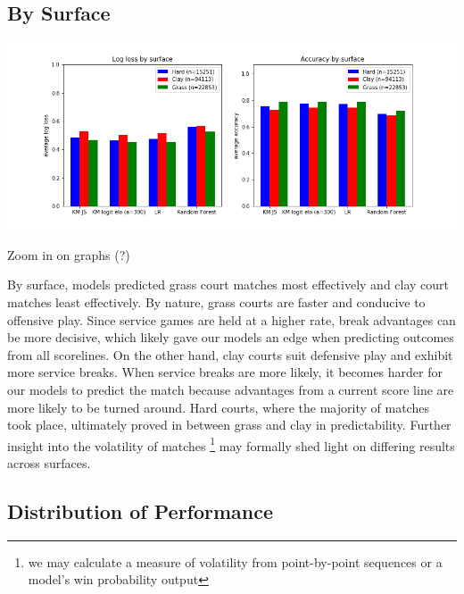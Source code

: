 \documentclass[chapterprefix=false]{report}
\begin{document}


\subsection{By Surface}

\hspace*{-1.5cm}\includegraphics[scale=.6]{surface_performance}

Zoom in on graphs (?)

By surface, models predicted grass court matches most effectively and clay court matches least effectively. By nature, grass courts are faster and conducive to offensive play. Since service games are held at a higher rate, break advantages can be more decisive, which likely gave our models an edge when predicting outcomes from all scorelines. On the other hand, clay courts suit defensive play and exhibit more service breaks. When service breaks are more likely, it becomes harder for our models to predict the match because advantages from a current score line are more likely to be turned around. Hard courts, where the majority of matches took place, ultimately proved in between grass and clay in predictability. Further insight into the volatility of matches \footnote{we may calculate a measure of volatility from point-by-point sequences or a model's win probability output} may formally shed light on differing results across surfaces.

\subsection{Distribution of Performance}
\end{document}
